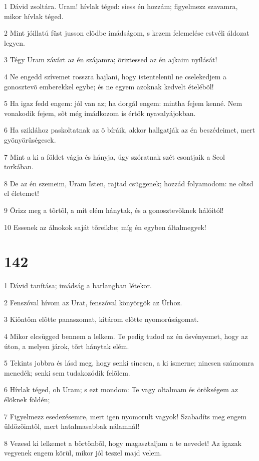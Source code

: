 \par 1 Dávid zsoltára. Uram! hívlak téged: siess én hozzám; figyelmezz szavamra, mikor hívlak téged.
\par 2 Mint jóillatú füst jusson elõdbe imádságom, s kezem felemelése estvéli áldozat legyen.
\par 3 Tégy Uram závárt az én szájamra; õriztessed az én ajkaim nyílását!
\par 4 Ne engedd szívemet rosszra hajlani, hogy istentelenül ne cselekedjem a gonosztevõ emberekkel egybe; és ne egyem azoknak kedvelt ételébõl!
\par 5 Ha igaz fedd engem: jól van az; ha dorgál engem: mintha fejem kenné. Nem vonakodik fejem, sõt még imádkozom is értök nyavalyájokban.
\par 6 Ha sziklához paskoltatnak az õ bíráik, akkor hallgatják az én beszédeimet, mert gyönyörûségesek.
\par 7 Mint a ki a földet vágja és hányja, úgy szóratnak szét csontjaik a Seol torkában.
\par 8 De az én szemeim, Uram Isten, rajtad csüggenek; hozzád folyamodom: ne oltsd el életemet!
\par 9 Õrizz meg a tõrtõl, a mit elém hánytak, és a gonosztevõknek hálóitól!
\par 10 Essenek az álnokok saját tõreikbe; míg én egyben általmegyek!

\chapter{142}

\par 1 Dávid tanítása; imádság a barlangban létekor.
\par 2 Fenszóval hívom az Urat, fenszóval könyörgök az Úrhoz.
\par 3 Kiöntöm elõtte panaszomat, kitárom elõtte nyomorúságomat.
\par 4 Mikor elcsügged bennem a lelkem. Te pedig tudod az én ösvényemet, hogy az úton, a melyen járok, tõrt hánytak elém.
\par 5 Tekints jobbra és lásd meg, hogy senki sincsen, a ki ismerne; nincsen számomra menedék; senki sem tudakozódik felõlem.
\par 6 Hívlak téged, oh Uram; s ezt mondom: Te vagy oltalmam és örökségem az élõknek földén;
\par 7 Figyelmezz esedezésemre, mert igen nyomorult vagyok! Szabadíts meg engem üldözõimtõl, mert hatalmasabbak nálamnál!
\par 8 Vezesd ki lelkemet a börtönbõl, hogy magasztaljam a te nevedet! Az igazak vegyenek engem körül, mikor jól teszel majd velem.

